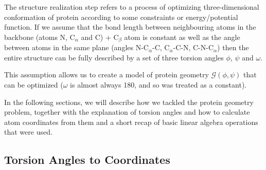 The structure realization step refers to a process of optimizing three-dimensional conformation of protein according to some constraints or energy/potential function. 
If we assume that the bond length between neighbouring atoms in the backbone (atoms N, C$_\alpha$ and C) + C$_\beta$ atom is constant as well as the angle between atoms in the same plane (angles N-C$_{\alpha}$-C, C$_{\alpha}$-C-N, C-N-C$_{\alpha}$) then the entire structure can be fully described by a set of three torsion angles $\phi$, $\psi$ and $\omega$.

This assumption allows us to create a model of protein geometry $\mathcal{G}(\phi, \psi)$ that can be optimized ($\omega$ is almost always 180\degree, and so was treated as a constant). 

In the following sections, we will describe how we tackled the protein geometry problem, together with the explanation of torsion angles and how to calculate atom coordinates from them and a short recap of basic linear algebra operations that were used.

\subsection{Torsion Angles to Coordinates}




